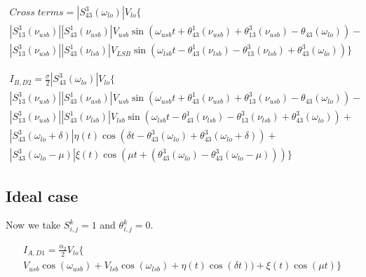 \vspace{0.5cm}

\begin{equation}
    \begin{gathered}
    Cross\;terms = |S_{43}^3(\omega_{lo})|V_{lo}\big\{ \\
    |S_{13}^3(\nu_{usb})||S_{43}^1(\nu_{usb})|V_{usb}\sin(\omega_{usb}t+\theta_{43}^1(\nu_{usb})+\theta_{13}^3(\nu_{usb})-\theta_{43}(\omega_{lo}))-\\
    |S_{13}^3(\nu_{usb})||S_{43}^1(\nu_{lsb})|V_{LSB}\sin(\omega_{lsb}t-\theta_{43}^1(\nu_{lsb})-\theta_{13}^3(\nu_{lsb})+\theta_{43}^3(\omega_{lo}))
    \big\}
    \end{gathered}
\end{equation}


\vspace{0.5cm}

\begin{equation}
    \boxed{
    \begin{gathered}
    I_{B,D2} = \frac{\sigma}{2}|S_{43}^3(\omega_{lo})|V_{lo} \big\{ \\
    |S_{13}^3(\nu_{usb})||S_{43}^1(\nu_{usb})|V_{usb}\sin(\omega_{usb}t+\theta_{43}^1(\nu_{usb})+\theta_{13}^3(\nu_{usb})-\theta_{43}(\omega_{lo}))-\\
    |S_{13}^3(\nu_{usb})||S_{43}^1(\nu_{lsb})|V_{lsb}\sin(\omega_{lsb}t-\theta_{43}^1(\nu_{lsb})-\theta_{13}^3(\nu_{lsb})+\theta_{43}^3(\omega_{lo})) +\\
    |S_{43}^3(\omega_{lo}+\delta)|\eta(t)
    \cos(\delta t-\theta_{43}^3(\omega_{lo})+\theta_{43}^3(\omega_{lo}+\delta)) + \\
    |S_{43}^3(\omega_{lo}-\mu)|\xi(t)\cos(\mu t+(\theta_{43}^3(\omega_{lo})-\theta_{43}^3(\omega_{lo}-\mu)))
    \big\}
    \end{gathered}
    }
\end{equation}

\newpage
\subsection{Ideal case}
Now we take $S_{i,j}^k=1$ and $\theta_{i,j}^k=0$.

\begin{equation}
    \label{eq:ideal_ia1}
    \begin{gathered}
        I_{A,D1} = \frac{\alpha_{2}}{2} V_{lo}\big\{ \\
        V_{usb}\cos(\omega_{usb})+ 
        V_{lsb}\cos(\omega_{lsb}) +
        \eta(t)\cos(\delta t)) +
        \xi(t)\cos(\mu t) \big\}
    \end{gathered}
\end{equation}

